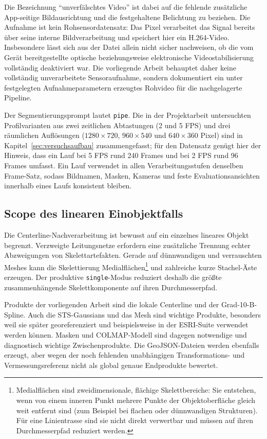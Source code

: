 Die Bezeichnung ``unverfälschtes Video'' ist dabei auf die fehlende zusätzliche
App-seitige Bildausrichtung und die festgehaltene Belichtung zu beziehen. Die
Aufnahme ist kein Rohsensordatensatz: Das Pixel verarbeitet das Signal bereits
über seine interne Bildverarbeitung und speichert hier ein H.264-Video.
Insbesondere lässt sich aus der Datei allein nicht sicher nachweisen, ob die
vom Gerät bereitgestellte optische beziehungsweise elektronische
Videostabilisierung vollständig deaktiviert war. Die vorliegende Arbeit behauptet daher keine
vollständig unverarbeitete Sensoraufnahme, sondern dokumentiert ein unter
festgelegten Aufnahmeparametern erzeugtes Rohvideo für die nachgelagerte
Pipeline.

Der Segmentierungsprompt lautet \texttt{pipe}. Die in der Projektarbeit
untersuchten Profilvarianten aus zwei zeitlichen Abtastungen (2 und 5 FPS) und
drei räumlichen Auflösungen ($1280\times720$, $960\times540$ und
$640\times360$ Pixel) sind in Kapitel~\ref{sec:versuchsaufbau} zusammengefasst;
für den Datensatz genügt hier der Hinweis, dass ein Lauf bei 5 FPS rund 240
Frames und bei 2 FPS rund 96 Frames umfasst. Ein Lauf verwendet in allen
Verarbeitungsstufen denselben Frame-Satz, sodass Bildnamen, Masken, Kameras
und feste Evaluationsansichten innerhalb eines Laufs konsistent bleiben.

\subsection{Scope des linearen Einobjektfalls}

Die Centerline-Nachverarbeitung ist bewusst auf ein einzelnes lineares Objekt
begrenzt. Verzweigte Leitungsnetze erfordern eine zusätzliche Trennung echter
Abzweigungen von Skelettartefakten. Gerade auf dünnwandigen und verrauschten
Meshes kann die Skelettierung Medialflächen\footnote{Medialflächen sind
zweidimensionale, flächige Skelettbereiche: Sie entstehen, wenn von einem
inneren Punkt mehrere Punkte der Objektoberfläche gleich weit entfernt sind
(zum Beispiel bei flachen oder dünnwandigen Strukturen). Für eine
Linientrasse sind sie nicht direkt verwertbar und müssen auf ihren
Durchmesserpfad reduziert werden.\label{fn:medialflaechen}} und zahlreiche
kurze Stachel-Äste erzeugen. Der produktive \texttt{single}-Modus reduziert
deshalb die größte zusammenhängende Skelettkomponente auf ihren
Durchmesserpfad.

Produkte der vorliegenden Arbeit sind die lokale Centerline und der Grad-10-B-Spline. Auch die
STS-Gaussians und das Mesh sind wichtige Produkte, besonders weil sie später
georeferenziert und beispielsweise in der ESRI-Suite verwendet werden können.
Masken und COLMAP-Modell sind dagegen notwendige und diagnostisch wichtige
Zwischenprodukte. Die GeoJSON-Dateien werden ebenfalls erzeugt, aber wegen der
noch fehlenden unabhängigen Transformations- und Vermessungsreferenz nicht als
global genaue Endprodukte bewertet.

